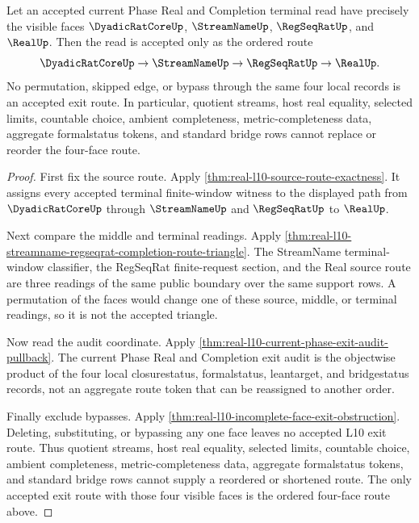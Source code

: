 \begin{theorem}
\label{thm:real-l10-face-order-rigidity}
Let an accepted current Phase Real and Completion terminal read have precisely
the visible faces $\DyadicRatCoreUp$, $\StreamNameUp$, $\RegSeqRatUp$, and
$\RealUp$. Then the read is accepted only as the ordered route
$$
\DyadicRatCoreUp \to \StreamNameUp \to \RegSeqRatUp \to \RealUp.
$$
No permutation, skipped edge, or bypass through the same four local records is
an accepted exit route. In particular, quotient streams, host real equality,
selected limits, countable choice, ambient completeness, metric-completeness
data, aggregate formalstatus tokens, and standard bridge rows cannot replace
or reorder the four-face route.
\end{theorem}
\begin{proof}
First fix the source route. Apply
\autoref{thm:real-l10-source-route-exactness}. It assigns every accepted
terminal finite-window witness to the displayed path from $\DyadicRatCoreUp$
through $\StreamNameUp$ and $\RegSeqRatUp$ to $\RealUp$.

Next compare the middle and terminal readings. Apply
\autoref{thm:real-l10-streamname-regseqrat-completion-route-triangle}. The
StreamName terminal-window classifier, the RegSeqRat finite-request section,
and the Real source route are three readings of the same public boundary over
the same support rows. A permutation of the faces would change one of these
source, middle, or terminal readings, so it is not the accepted triangle.

Now read the audit coordinate. Apply
\autoref{thm:real-l10-current-phase-exit-audit-pullback}. The current Phase
Real and Completion exit audit is the objectwise product of the four local
closurestatus, formalstatus, leantarget, and bridgestatus records, not an
aggregate route token that can be reassigned to another order.

Finally exclude bypasses. Apply
\autoref{thm:real-l10-incomplete-face-exit-obstruction}. Deleting,
substituting, or bypassing any one face leaves no accepted L10 exit route.
Thus quotient streams, host real equality, selected limits, countable choice,
ambient completeness, metric-completeness data, aggregate formalstatus tokens,
and standard bridge rows cannot supply a reordered or shortened route. The only
accepted exit route with those four visible faces is the ordered four-face
route above.
\end{proof}

